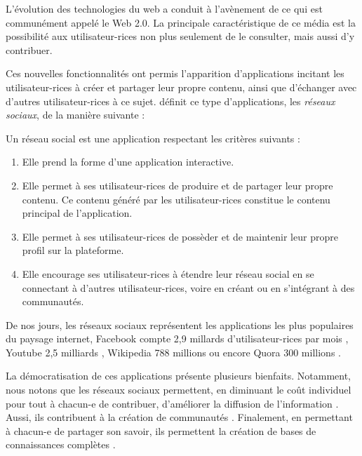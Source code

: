 \label{sec:intro-contexte}

L'évolution des technologies du web a conduit à l'avènement de ce qui est communément appelé le Web 2.0.
La principale caractéristique de ce média est la possibilité aux utilisateur-rices non plus seulement de le consulter, mais aussi d'y contribuer.

Ces nouvelles fonctionnalités ont permis l'apparition d'applications incitant les utilisateur-rices à créer et partager leur propre contenu, ainsi que d'échanger avec d'autres utilisateur-rices à ce sujet.
\cite{2015-social-media-definition-obar} définit ce type d'applications, \ie les \emph{réseaux sociaux}, de la manière suivante :
\begin{definition}
  Un réseau social est une application respectant les critères suivants :
  \begin{enumerate}
    \item Elle prend la forme d'une application interactive.
    \item Elle permet à ses utilisateur-rices de produire et de partager leur propre contenu.
      Ce contenu généré par les utilisateur-rices constitue le contenu principal de l'application.
    \item Elle permet à ses utilisateur-rices de possèder et de maintenir leur propre profil sur la plateforme.
    \item Elle encourage ses utilisateur-rices à étendre leur réseau social en se connectant à d'autres utilisateur-rices, voire en créant ou en s'intégrant à des communautés.
  \end{enumerate}
\end{definition}
De nos jours, les réseaux sociaux représentent les applications les plus populaires du paysage internet, \eg Facebook compte 2,9 millards d'utilisateur-rices par mois \cite{2022-01-monthly-active-users-social-networks}, Youtube 2,5 milliards \cite{2022-01-monthly-active-users-social-networks}, Wikipedia 788 millions {\cite{2022-09-monthly-active-users-wikipedia}} ou encore Quora 300 millions \cite{2022-01-monthly-active-users-social-networks}.

La démocratisation de ces applications présente plusieurs bienfaits.
Notamment, nous notons que les réseaux sociaux permettent, en diminuant le coût individuel pour tout à chacun-e de contribuer, d'améliorer la diffusion de l'information \cite{2012-youtube-social-movements-meek,2013-wealth-occupation-networks-theocharis}.
Aussi, ils contribuent à la création de communautés \cite{2013-understanding-social-media-logic-van-dijck}.
Finalement, en permettant à chacun-e de partager son savoir, ils permettent la création de bases de connaissances complètes \cite{2005-internet-encyclopaedias-head-to-head,2008-knowledge-sharing-yahoo-answers-adamic}.

